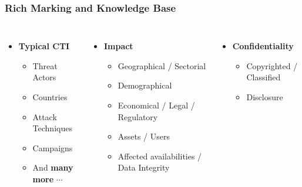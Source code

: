 \begin{frame}
    \frametitle{Rich Marking and Knowledge Base}

    \begin{columns}[T,onlytextwidth]
        \begin{itemize}
            \item \textbf{Typical CTI}
            \begin{itemize}
                \item Threat Actors
                \item Countries
                \item Attack Techniques
                \item Campaigns
                \item And \textbf{many more} $\cdots$
            \end{itemize}
        \end{itemize}

        \vspace{0.5em}

        \begin{itemize}
            \item \textbf{Impact}
            \begin{itemize}
                \item Geographical / Sectorial
                \item Demographical
                \item Economical / Legal / Regulatory
                \item Assets / Users
                \item Affected availabilities / Data Integrity
            \end{itemize}
        \end{itemize}


        \begin{itemize}
            \item \textbf{Confidentiality}
            \begin{itemize}
                \item Copyrighted / Classified
                \item Disclosure
            \end{itemize}
        \end{itemize}

        \vspace{0.5em}


\end{columns}
\end{frame}
